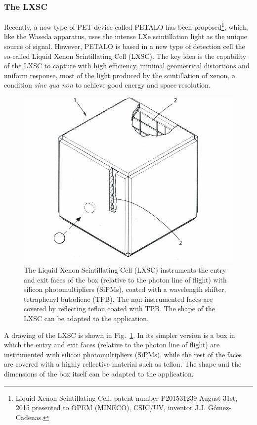 \subsubsection*{The LXSC}

Recently, a new type of PET device called PETALO has been proposed\footnote{Liquid Xenon Scintillating Cell, patent number P201531239 August 31st, 2015 presented to OPEM (MINECO), CSIC/UV, inventor J.J. G\'omez-Cadenas.}, which, like the Waseda apparatus, uses the intense LXe scintillation light as the unique source of signal. However, PETALO is based in a new type of detection cell  the so-called Liquid Xenon Scintillating Cell (LXSC). The key idea is the capability of the LXSC to capture with high efficiency, minimal geometrical distortions and uniform response, most of the light produced by the scintillation of xenon, a condition \emph{sine qua non} to achieve good energy and space resolution. 

\begin{figure}[!htbp]
	\centering
	\includegraphics[scale=0.6]{img/LXSC2.pdf}
	\caption{\label{fig.box} The Liquid Xenon Scintillating Cell (LXSC) instruments the entry and exit faces of the box (relative to the photon line of flight) with silicon photomultipliers (SiPMs), coated with a wavelength shifter, tetraphenyl butadiene (TPB). The non-instrumented faces are covered by reflecting teflon coated with TPB. The shape of the LXSC can be adapted to the application. }
\end{figure}

A drawing of the LXSC is shown in Fig.~\ref{fig.box}. In its simpler version is a box in which 
the entry and exit faces (relative to the photon line of flight) are instrumented with silicon photomultipliers (SiPMs), while the rest of the faces are covered with a highly reflective material such as teflon. The shape and the dimensions of the box itself can be adapted to the application. 

